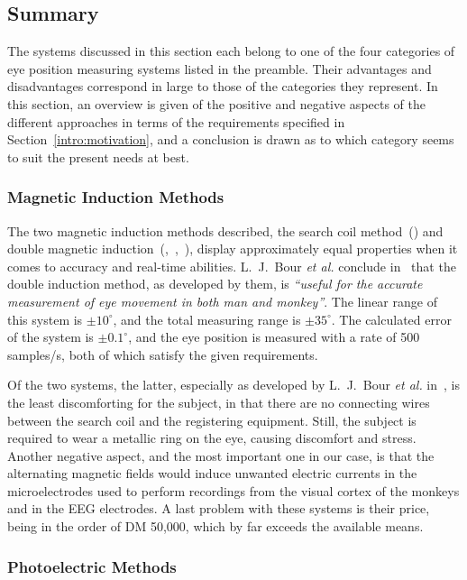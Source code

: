 \subsection{Summary}
\label{back:track:summary}

The systems discussed in this section each belong to one of the four
categories of eye position measuring systems listed in the preamble.
Their advantages and disadvantages correspond in large to those of the
categories they represent.  In this section, an overview is given of
the positive and negative aspects of the different approaches in terms
of the requirements specified in Section~\ref{intro:motivation}, and a
conclusion is drawn as to which category seems to suit the present
needs at best.

\subsubsection{Magnetic Induction Methods}

The two magnetic induction methods described, the search coil
method~(\cite{robinson}) and double magnetic
induction~(\cite{allik},~\cite{reulen},~\cite{coil}), display
approximately equal properties when it comes to accuracy and real-time
abilities.  L.\ J.\ Bour {\em et al.\/} conclude in~\cite{coil} that
the double induction method, as developed by them, is {\em ``useful
  for the accurate measurement of eye movement in both man and
  monkey''\/}.  The linear range of this system is $\pm 10^{\circ}$,
and the total measuring range is $\pm 35^{\circ}$.  The calculated
error of the system is $\pm 0.1^{\circ}$, and the eye position is
measured with a rate of 500 samples/s, both of which satisfy the
given requirements.

Of the two systems, the latter, especially as developed by L.\ J.\ 
Bour {\em et al.\/} in~\cite{coil}, is the least discomforting for the
subject, in that there are no connecting wires between the search coil
and the registering equipment.  Still, the subject is required to wear
a metallic ring on the eye, causing discomfort and stress.  Another
negative aspect, and the most important one in our case, is that the
alternating magnetic fields would induce unwanted electric currents in
the microelectrodes used to perform recordings from the visual cortex
of the monkeys and in the EEG electrodes.  A last problem with these
systems is their price, being in the order of DM 50,000, which by far
exceeds the available means.

\subsubsection{Photoelectric Methods}

